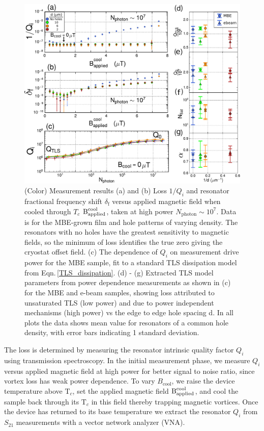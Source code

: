 \documentclass[aip,jap,reprint,nobalancelastpage]{revtex4-1}
\begin{document}
\begin{figure}
\begin{center}

\includegraphics[width=500 pt]{DielectricFluxTrap_ExpData_arxiv_Rev2c_proof_revision1.pdf}

\end{center}
\caption{(Color) Measurement results  (a) and (b) Loss $1/Q_i$ and resonator fractional frequency shift $\delta_{\textrm{f}}$ versus applied magnetic field when cooled through $T_c$ $\text{B}^{\text{cool}}_{\text{applied}}$, taken at high power $N_\textrm{photon} \sim 10^7$.  Data is for the MBE-grown film and hole patterns of varying density.  The resonators with no holes have the greatest sensitivity to magnetic fields, so the minimum of loss identifies the true zero giving the cryostat offset field.  (c) The dependence of $Q_i$ on measurement drive power for the MBE sample, fit to a standard TLS dissipation model from Eqn.\,\ref{TLS_dissipation}.  (d) - (g) Extracted TLS model parameters from power dependence measurements as shown in (c) for the MBE and e-beam samples, showing loss attributed to unsaturated TLS (low power) and due to power independent mechanisms (high power) vs the edge to edge hole spacing d.  In all plots the data shows mean value for resonators of a common hole density, with error bars indicating 1 standard deviation.}
\label{Resonator Measurements}
\end{figure}

The loss is determined by measuring the resonator intrinsic quality factor $Q_i$ using transmission spectroscopy\cite{megrant2012}.  In the initial measurement phase, we measure $Q_i$ versus applied magnetic field at high power for better signal to noise ratio, since vortex loss has weak power dependence\cite{bothner2011}.  To vary $B_\textrm{cool}$, we raise the device temperature above $\text{T}_{c}$, set the applied magnetic field $\text{B}^{\text{cool}}_{\text{applied}}$, and cool the sample back through its $\text{T}_{c}$ in this field thereby trapping magnetic vortices.  Once the device has returned to its base temperature we extract the resonator $Q_i$ from $S_{21}$ measurements with a vector network analyzer (VNA).
\end{document}
